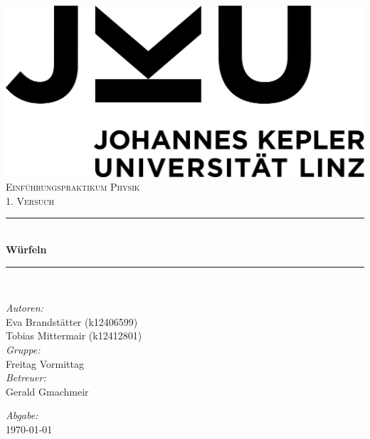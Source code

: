 \documentclass[a4paper,12pt]{article}
\begin{document}
\begin{titlepage}
    \centering
    \includegraphics[scale = 0.03]{bilder/JKU_Logo.png}\\[1.0 cm]	%
    \textsc{\Large Einführungspraktikum Physik}\\[0.5 cm]	        %
    \textsc{\large 1. Versuch}\\[0.5 cm]				            %
    \rule{\linewidth}{0.4 mm} \\[0.4 cm]
    { \huge \bfseries Würfeln}\\                                    %
    \rule{\linewidth}{0.4 mm} \\[1.5 cm]
    \begin{minipage}{0.8\textwidth}
        \begin{flushleft} \large
            \emph{Autoren:}\\
            Eva Brandstätter (k12406599)\\
            Tobias Mittermair (k12412801)\\
            \vspace{1cm}
            \emph{Gruppe:}\\
            Freitag Vormittag\\
            \vspace{1cm}
            \emph{Betreuer:}\\
            Gerald Gmachmeir
        \end{flushleft}
        \begin{flushright} \large
            \vspace{8cm}
            \emph{Abgabe:} \\
            \today
        \end{flushright}
    \end{minipage}~

    \vfill
    
\end{titlepage}
\end{document}
